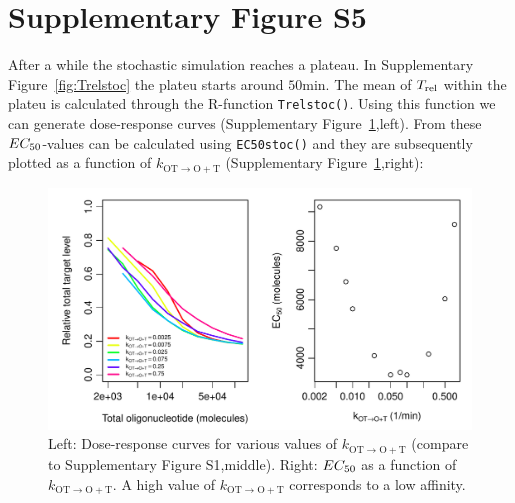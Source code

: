 \documentclass[a4paper,11pt]{article}
\newenvironment{Ncenter}{%
  \setlength\topsep{-10pt}
  \setlength\parskip{-10pt}
  \begin{center}
}{%
  \end{center}
}
\newcommand{\kmo}{k_{\mathrm{OT \to O+T}}}
\newcommand{\Trel}{T_{\rm{rel}}}
\newcommand{\EC}{EC_{\rm{50}}}
\begin{document}
\section{Supplementary Figure S5}
After a while the stochastic simulation reaches a plateau. In Supplementary Figure~\ref{fig:Trelstoc} the plateu starts around $50$min. The mean of $\Trel$ within the plateu is calculated through the R-function \texttt{Trelstoc()}. Using this function we can generate dose-response curves (Supplementary Figure~\ref{fig:stocEC50},left). From these $\EC$-values can be calculated using \texttt{EC50stoc()} and they are subsequently plotted as a function of $\kmo$ (Supplementary Figure~\ref{fig:stocEC50},right):
\begin{Schunk}
\end{Schunk}
\begin{figure}[!h]
\begin{Ncenter}
\includegraphics[width=\textwidth]{SuppFile1-EC50.pdf}
\end{Ncenter}
\caption{Left: Dose-response curves for various values of $\kmo$ (compare to Supplementary Figure S1,middle). Right: $\EC$ as a function of $\kmo$. A high value of $\kmo$ corresponds to a low affinity.}\label{fig:stocEC50}
\end{figure}
\newpage
\end{document}
